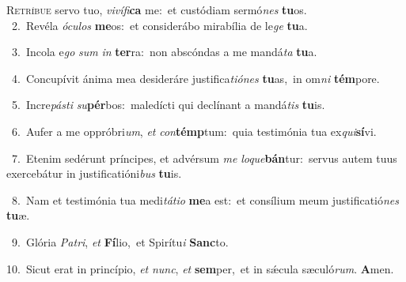 \lettrine{\initial\textcolor{\initialcolor}{R}}{etríbue} servo tuo, \textit{vi}\-\textit{ví}\textit{fi}\textbf{ca} me:~\star et custódiam sermó\textit{nes} \textbf{tu}\-os.\\
{\numbfont\textcolor{\numbcolor}{~2.}}~Revéla \textit{ó}\-\textit{cu}\textit{los} \textbf{me}\-os:~\star et considerábo mirabília de le\textit{ge} \textbf{tu}\-a.\par
{\numbfont\textcolor{\numbcolor}{~3.}}~Incola e\textit{go} \textit{sum} \textit{in} \textbf{ter}\-ra:~\star non abscóndas a me mandá\textit{ta} \textbf{tu}\-a.\par
{\numbfont\textcolor{\numbcolor}{~4.}}~Concupívit ánima mea desideráre justifica\-\textit{ti}\-\textit{ó}\textit{nes} \textbf{tu}\-as,~\star in om\textit{ni} \textbf{tém}\-pore.\par
{\numbfont\textcolor{\numbcolor}{~5.}}~Incre\-\textit{pás}\-\textit{ti} \textit{su}\-\textbf{pér}bos:~\star maledícti qui declínant a mandá\textit{tis} \textbf{tu}\-is.\par
{\numbfont\textcolor{\numbcolor}{~6.}}~Aufer a me oppróbri\-\textit{um}\-, \textit{et} \textit{con}\-\textbf{témp}tum:~\star quia testimónia tua ex\-\textit{qui}\-\textbf{sí}vi.\par
{\numbfont\textcolor{\numbcolor}{~7.}}~Etenim sedérunt príncipes, et advérsum \textit{me} \textit{lo}\-\textit{que}\textbf{bán}tur:~\star servus autem tuus exercebátur in justificatióni\textit{bus} \textbf{tu}\-is.\par
{\numbfont\textcolor{\numbcolor}{~8.}}~Nam et testimónia tua medi\-\textit{tá}\-\textit{ti}\textit{o} \textbf{me}\-a est:~\star et consílium meum justificatió\textit{nes} \textbf{tu}\-æ.\par
{\numbfont\textcolor{\numbcolor}{~9.}}~Glória \textit{Pa}\-\textit{tri}, \textit{et} \textbf{Fí}\-lio,~\star et Spirítu\textit{i} \textbf{Sanc}\-to.\par
{\numbfont\textcolor{\numbcolor}{10.}}~Sicut erat in princípio, \textit{et} \textit{nunc}\-, \textit{et} \textbf{sem}\-per,~\star et in sǽcula sæculó\-\textit{rum}\-. \textbf{A}\-men.\par
